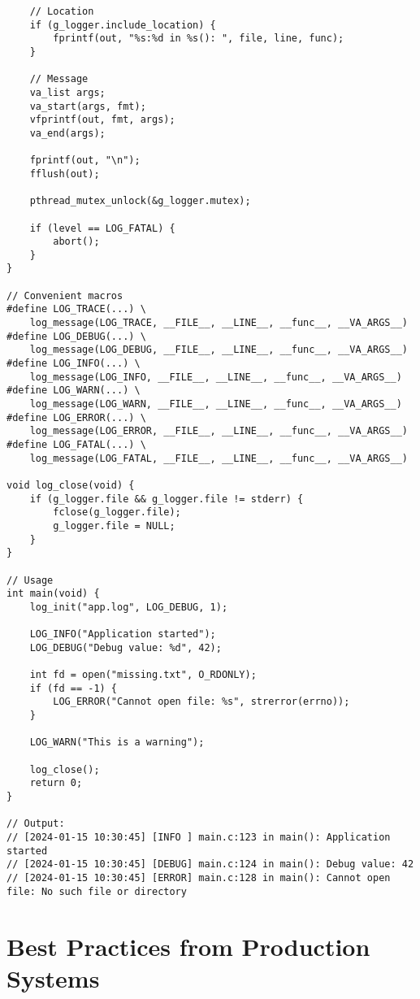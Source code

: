 \begin{lstlisting}
    // Location
    if (g_logger.include_location) {
        fprintf(out, "%s:%d in %s(): ", file, line, func);
    }

    // Message
    va_list args;
    va_start(args, fmt);
    vfprintf(out, fmt, args);
    va_end(args);

    fprintf(out, "\n");
    fflush(out);

    pthread_mutex_unlock(&g_logger.mutex);

    if (level == LOG_FATAL) {
        abort();
    }
}

// Convenient macros
#define LOG_TRACE(...) \
    log_message(LOG_TRACE, __FILE__, __LINE__, __func__, __VA_ARGS__)
#define LOG_DEBUG(...) \
    log_message(LOG_DEBUG, __FILE__, __LINE__, __func__, __VA_ARGS__)
#define LOG_INFO(...) \
    log_message(LOG_INFO, __FILE__, __LINE__, __func__, __VA_ARGS__)
#define LOG_WARN(...) \
    log_message(LOG_WARN, __FILE__, __LINE__, __func__, __VA_ARGS__)
#define LOG_ERROR(...) \
    log_message(LOG_ERROR, __FILE__, __LINE__, __func__, __VA_ARGS__)
#define LOG_FATAL(...) \
    log_message(LOG_FATAL, __FILE__, __LINE__, __func__, __VA_ARGS__)

void log_close(void) {
    if (g_logger.file && g_logger.file != stderr) {
        fclose(g_logger.file);
        g_logger.file = NULL;
    }
}

// Usage
int main(void) {
    log_init("app.log", LOG_DEBUG, 1);

    LOG_INFO("Application started");
    LOG_DEBUG("Debug value: %d", 42);

    int fd = open("missing.txt", O_RDONLY);
    if (fd == -1) {
        LOG_ERROR("Cannot open file: %s", strerror(errno));
    }

    LOG_WARN("This is a warning");

    log_close();
    return 0;
}

// Output:
// [2024-01-15 10:30:45] [INFO ] main.c:123 in main(): Application started
// [2024-01-15 10:30:45] [DEBUG] main.c:124 in main(): Debug value: 42
// [2024-01-15 10:30:45] [ERROR] main.c:128 in main(): Cannot open file: No such file or directory
\end{lstlisting}

\section{Best Practices from Production Systems}

